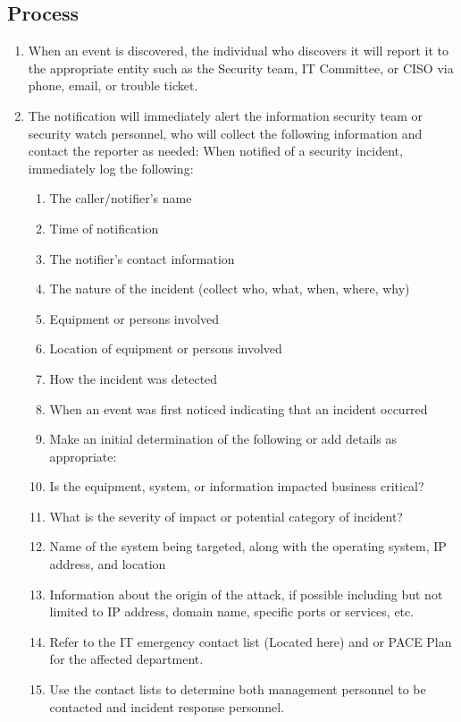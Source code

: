 \documentclass[../main.tex]{subfiles}
\begin{document}
\subsection{Process}
\begin{enumerate}
    \item When an event is discovered, the individual who discovers it will report it to the appropriate entity such as the Security team, IT Committee,
    or CISO via phone, email, or trouble ticket.
    \item The notification will immediately alert the information security team or security watch personnel, who will collect the following information
    and contact the reporter as needed: When notified of a security incident, immediately log the following:
    \begin{enumerate}
        \item The caller/notifier's name
        \item Time of notification
        \item The notifier's contact information
        \item The nature of the incident (collect who, what, when, where, why)
        \item Equipment or persons involved
        \item Location of equipment or persons involved
        \item How the incident was detected
        \item When an event was first noticed indicating that an incident occurred
        \item Make an initial determination of the following or add details as appropriate:
        \item Is the equipment, system, or information impacted business critical?
        \item What is the severity of impact or potential category of incident?
        \item Name of the system being targeted, along with the operating system, IP address, and location
        \item Information about the origin of the attack, if possible including but not limited to IP address, domain name, specific ports or services, etc.
        \item Refer to the IT emergency contact list (Located here) and or PACE Plan for the affected department.
        \item Use the contact lists to determine both management personnel to be contacted and incident response personnel.

\end{enumerate}
\end{enumerate}
\end{document}
